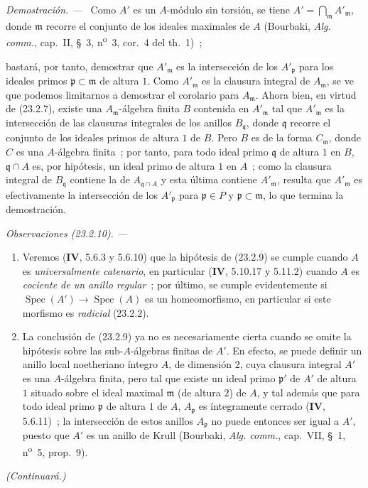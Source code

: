\documentclass[10pt,oneside]{book}
\makeatletter
\newcommand{\setmanualcurrentlabel}[1]{\def\@currentlabel{#1}}
\newcommand{\oldpage}[2][]{%
  \setcounter{footnote}{0}%
  \marginpar{\scriptsize\textbf{#1}~|~#2}\ignorespaces}
\newenvironment{remarks}[1][]{%
  \setmanualcurrentlabel{#1}\par\medskip\noindent\itshape Observaciones (#1). ---\ }{\par}
\newenvironment{proof}{%
  \par\medskip\noindent\textit{Demostración. ---\ }}{\par}
\makeatother
\begin{document}
\begin{proof}
Como $A'$ es un $A$-módulo sin torsión, se tiene
$A'=\bigcap_{\mathfrak m}A'_{\mathfrak m}$, donde $\mathfrak m$ recorre el conjunto de los ideales
maximales de $A$ (Bourbaki, \emph{Alg. comm.}, cap.~II, §~3,
n\textsuperscript{o}~3, cor.~4 del th.~1)~;

\oldpage[0\textsubscript{IV-1}]{221}

bastará, por tanto, demostrar que $A'_{\mathfrak m}$ es la intersección de los
$A'_{\mathfrak p}$ para los ideales primos $\mathfrak p\subset\mathfrak m$
de altura $1$. Como $A'_{\mathfrak m}$ es la clausura integral de
$A_{\mathfrak m}$, se ve que podemos limitarnos a demostrar el corolario para
$A_{\mathfrak m}$. Ahora bien, en virtud de (23.2.7), existe una
$A_{\mathfrak m}$-álgebra finita $B$ contenida en $A'_{\mathfrak m}$ tal
que $A'_{\mathfrak m}$ es la intersección de las clausuras integrales de los anillos
$B_{\mathfrak q}$, donde $\mathfrak q$ recorre el conjunto de los ideales primos de
altura $1$ de $B$. Pero $B$ es de la forma $C_{\mathfrak m}$, donde $C$ es
una $A$-álgebra finita~; por tanto, para todo ideal primo $\mathfrak q$ de altura
$1$ en $B$, $\mathfrak q\cap A$ es, por hipótesis, un ideal primo de
altura $1$ en $A$~; como la clausura integral de $B_{\mathfrak q}$
contiene la de $A_{\mathfrak q\cap A}$ y esta última contiene
$A'_{\mathfrak m}$, resulta que $A'_{\mathfrak m}$ es efectivamente
la intersección de los $A'_{\mathfrak p}$ para $\mathfrak p\in P$ y
$\mathfrak p\subset\mathfrak m$, lo que termina la demostración.
\end{proof}

\begin{remarks}[23.2.10]
\label{0.23.2.10-es}
\begin{enumerate}
  \item[(i)] Veremos (\textbf{IV}, 5.6.3 y 5.6.10) que la hipótesis de (23.2.9)
  se cumple cuando $A$ es \emph{universalmente catenario}, en particular
  (\textbf{IV}, 5.10.17 y 5.11.2) cuando $A$ es \emph{cociente de un anillo
  regular}~; por último, se cumple evidentemente si
  $\operatorname{Spec}(A')\to\operatorname{Spec}(A)$ es un homeomorfismo,
  en particular si este morfismo es \emph{radicial} (23.2.2).

  \item[(ii)] La conclusión de (23.2.9) ya no es necesariamente cierta
  cuando se omite la hipótesis sobre las sub-$A$-álgebras finitas de $A'$. En
  efecto, se puede definir un anillo local noetheriano íntegro $A$, de dimensión
  $2$, cuya clausura integral $A'$ es una $A$-álgebra finita, pero tal que
  existe un ideal primo $\mathfrak p'$ de $A'$ de altura $1$ situado sobre
  el ideal maximal $\mathfrak m$ (de altura $2$) de $A$, y tal además que
  para todo ideal primo $\mathfrak p$ de altura $1$ de $A$,
  $A_{\mathfrak p}$ es íntegramente cerrado (\textbf{IV}, 5.6.11)~; la intersección de
  estos anillos $A_{\mathfrak p}$ no puede entonces ser igual a $A'$, puesto que $A'$
  es un anillo de Krull (Bourbaki, \emph{Alg. comm.}, cap.~VII, §~1,
  n\textsuperscript{o}~5, prop.~9).
\end{enumerate}
\end{remarks}

\begin{flushright}
\emph{(Continuará.)}
\end{flushright}
\end{document}
